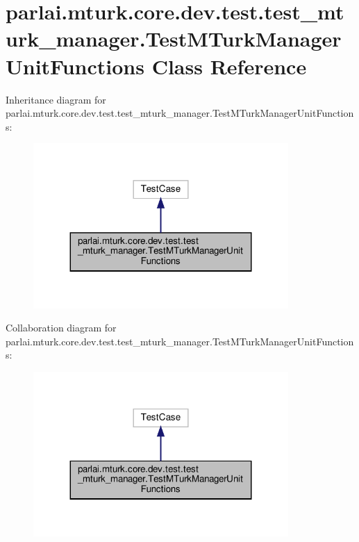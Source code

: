 \hypertarget{classparlai_1_1mturk_1_1core_1_1dev_1_1test_1_1test__mturk__manager_1_1TestMTurkManagerUnitFunctions}{}\section{parlai.\+mturk.\+core.\+dev.\+test.\+test\+\_\+mturk\+\_\+manager.\+Test\+M\+Turk\+Manager\+Unit\+Functions Class Reference}
\label{classparlai_1_1mturk_1_1core_1_1dev_1_1test_1_1test__mturk__manager_1_1TestMTurkManagerUnitFunctions}


Inheritance diagram for parlai.\+mturk.\+core.\+dev.\+test.\+test\+\_\+mturk\+\_\+manager.\+Test\+M\+Turk\+Manager\+Unit\+Functions\+:\nopagebreak
\begin{figure}[H]
\begin{center}
\leavevmode
\includegraphics[width=275pt]{df/dcd/classparlai_1_1mturk_1_1core_1_1dev_1_1test_1_1test__mturk__manager_1_1TestMTurkManagerUnitFunctions__inherit__graph}
\end{center}
\end{figure}


Collaboration diagram for parlai.\+mturk.\+core.\+dev.\+test.\+test\+\_\+mturk\+\_\+manager.\+Test\+M\+Turk\+Manager\+Unit\+Functions\+:\nopagebreak
\begin{figure}[H]
\begin{center}
\leavevmode
\includegraphics[width=275pt]{dd/d54/classparlai_1_1mturk_1_1core_1_1dev_1_1test_1_1test__mturk__manager_1_1TestMTurkManagerUnitFunctions__coll__graph}
\end{center}
\end{figure}

